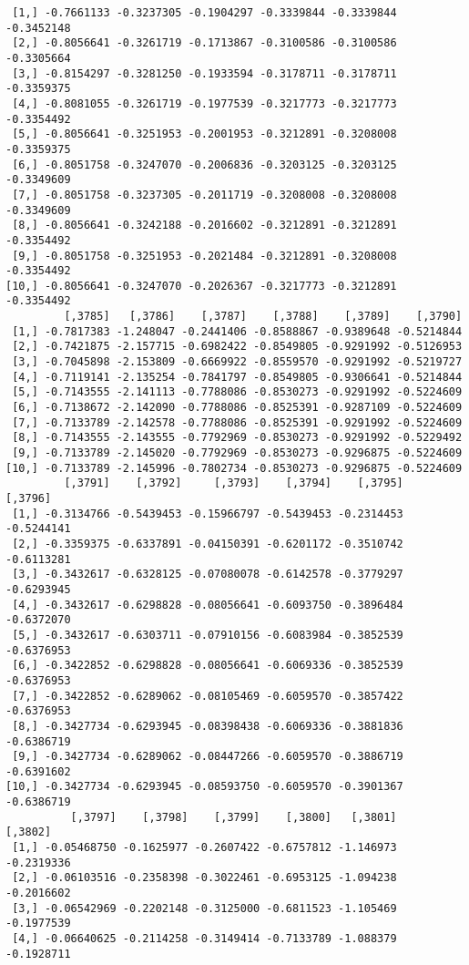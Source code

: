 \documentclass[
  letterpaper,
  DIV=11,
  numbers=noendperiod]{scrreprt}
\begin{document}
\begin{verbatim}
 [1,] -0.7661133 -0.3237305 -0.1904297 -0.3339844 -0.3339844 -0.3452148
 [2,] -0.8056641 -0.3261719 -0.1713867 -0.3100586 -0.3100586 -0.3305664
 [3,] -0.8154297 -0.3281250 -0.1933594 -0.3178711 -0.3178711 -0.3359375
 [4,] -0.8081055 -0.3261719 -0.1977539 -0.3217773 -0.3217773 -0.3354492
 [5,] -0.8056641 -0.3251953 -0.2001953 -0.3212891 -0.3208008 -0.3359375
 [6,] -0.8051758 -0.3247070 -0.2006836 -0.3203125 -0.3203125 -0.3349609
 [7,] -0.8051758 -0.3237305 -0.2011719 -0.3208008 -0.3208008 -0.3349609
 [8,] -0.8056641 -0.3242188 -0.2016602 -0.3212891 -0.3212891 -0.3354492
 [9,] -0.8051758 -0.3251953 -0.2021484 -0.3212891 -0.3208008 -0.3354492
[10,] -0.8056641 -0.3247070 -0.2026367 -0.3217773 -0.3212891 -0.3354492
         [,3785]   [,3786]    [,3787]    [,3788]    [,3789]    [,3790]
 [1,] -0.7817383 -1.248047 -0.2441406 -0.8588867 -0.9389648 -0.5214844
 [2,] -0.7421875 -2.157715 -0.6982422 -0.8549805 -0.9291992 -0.5126953
 [3,] -0.7045898 -2.153809 -0.6669922 -0.8559570 -0.9291992 -0.5219727
 [4,] -0.7119141 -2.135254 -0.7841797 -0.8549805 -0.9306641 -0.5214844
 [5,] -0.7143555 -2.141113 -0.7788086 -0.8530273 -0.9291992 -0.5224609
 [6,] -0.7138672 -2.142090 -0.7788086 -0.8525391 -0.9287109 -0.5224609
 [7,] -0.7133789 -2.142578 -0.7788086 -0.8525391 -0.9291992 -0.5224609
 [8,] -0.7143555 -2.143555 -0.7792969 -0.8530273 -0.9291992 -0.5229492
 [9,] -0.7133789 -2.145020 -0.7792969 -0.8530273 -0.9296875 -0.5224609
[10,] -0.7133789 -2.145996 -0.7802734 -0.8530273 -0.9296875 -0.5224609
         [,3791]    [,3792]     [,3793]    [,3794]    [,3795]    [,3796]
 [1,] -0.3134766 -0.5439453 -0.15966797 -0.5439453 -0.2314453 -0.5244141
 [2,] -0.3359375 -0.6337891 -0.04150391 -0.6201172 -0.3510742 -0.6113281
 [3,] -0.3432617 -0.6328125 -0.07080078 -0.6142578 -0.3779297 -0.6293945
 [4,] -0.3432617 -0.6298828 -0.08056641 -0.6093750 -0.3896484 -0.6372070
 [5,] -0.3432617 -0.6303711 -0.07910156 -0.6083984 -0.3852539 -0.6376953
 [6,] -0.3422852 -0.6298828 -0.08056641 -0.6069336 -0.3852539 -0.6376953
 [7,] -0.3422852 -0.6289062 -0.08105469 -0.6059570 -0.3857422 -0.6376953
 [8,] -0.3427734 -0.6293945 -0.08398438 -0.6069336 -0.3881836 -0.6386719
 [9,] -0.3427734 -0.6289062 -0.08447266 -0.6059570 -0.3886719 -0.6391602
[10,] -0.3427734 -0.6293945 -0.08593750 -0.6059570 -0.3901367 -0.6386719
          [,3797]    [,3798]    [,3799]    [,3800]   [,3801]    [,3802]
 [1,] -0.05468750 -0.1625977 -0.2607422 -0.6757812 -1.146973 -0.2319336
 [2,] -0.06103516 -0.2358398 -0.3022461 -0.6953125 -1.094238 -0.2016602
 [3,] -0.06542969 -0.2202148 -0.3125000 -0.6811523 -1.105469 -0.1977539
 [4,] -0.06640625 -0.2114258 -0.3149414 -0.7133789 -1.088379 -0.1928711

\end{verbatim}
\end{document}
